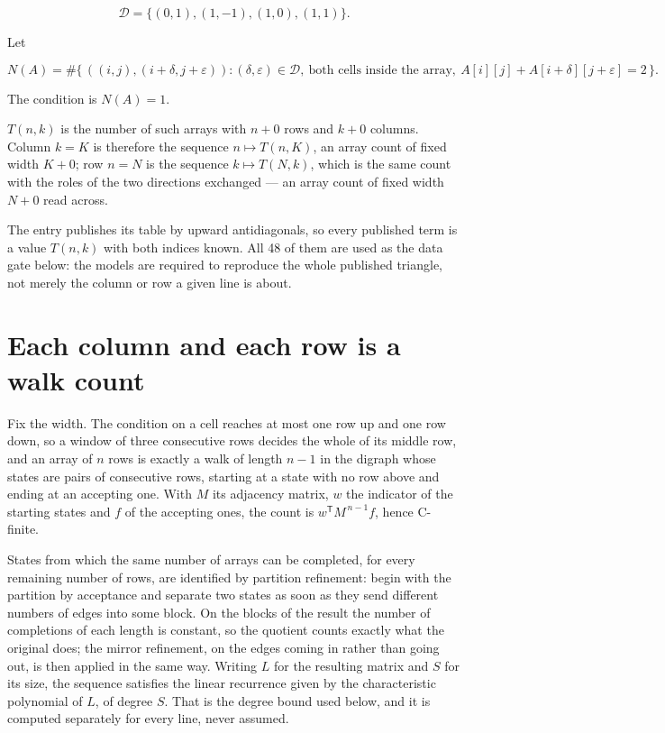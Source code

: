 \documentclass[11pt]{article}
\theoremstyle{definition}
\begin{document}
\[\mathcal{D} = \{(0,1), (1,-1), (1,0), (1,1)\}.\]

Let

\[N(A) = \#\bigl\{\,((i,j),(i{+}\delta,j{+}\varepsilon)) : (\delta,\varepsilon) \in \mathcal{D},\ \text{both cells inside the array},\ A[i][j] + A[i{+}\delta][j{+}\varepsilon] = 2\,\bigr\}.\]

The condition is $N(A) = 1$.

$T(n,k)$ is the number of such arrays with $n + 0$ rows and $k + 0$ columns. Column $k = K$ is therefore the sequence $n \mapsto T(n,K)$, an array count of fixed width $K + 0$; row $n = N$ is the sequence $k \mapsto T(N,k)$, which is the same count with the roles of the two directions exchanged --- an array count of fixed width $N + 0$ read across.

The entry publishes its table by upward antidiagonals, so every published term is a value $T(n,k)$ with both indices known. All 48 of them are used as the data gate below: the models are required to reproduce the whole published triangle, not merely the column or row a given line is about.

\section{Each column and each row is a walk count}

Fix the width. The condition on a cell reaches at most one row up and one row down, so a window of three consecutive rows decides the whole of its middle row, and an array of $n$ rows is exactly a walk of length $n-1$ in the digraph whose states are pairs of consecutive rows, starting at a state with no row above and ending at an accepting one. With $M$ its adjacency matrix, $w$ the indicator of the starting states and $f$ of the accepting ones, the count is $w^{\mathsf T}M^{\,n-1}f$, hence C-finite.

States from which the same number of arrays can be completed, for every remaining number of rows, are identified by partition refinement: begin with the partition by acceptance and separate two states as soon as they send different numbers of edges into some block. On the blocks of the result the number of completions of each length is constant, so the quotient counts exactly what the original does; the mirror refinement, on the edges coming in rather than going out, is then applied in the same way. Writing $L$ for the resulting matrix and $S$ for its size, the sequence satisfies the linear recurrence given by the characteristic polynomial of $L$, of degree $S$. That is the degree bound used below, and it is computed separately for every line, never assumed.
\end{document}

